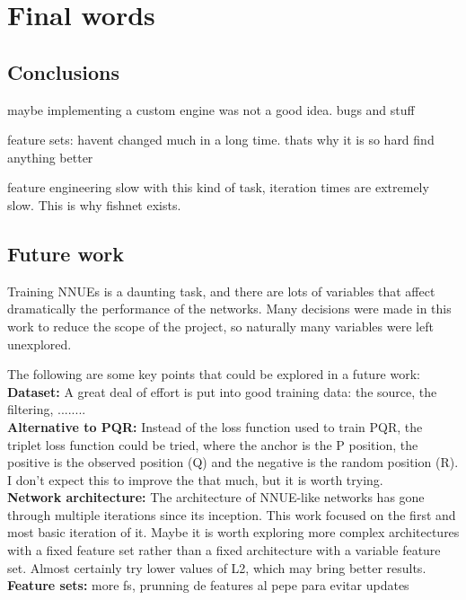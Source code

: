 \section{Final words}
\subsection{Conclusions}

maybe implementing a custom engine was not a good idea. bugs and stuff

feature sets: havent changed much in a long time. thats why it is so hard find anything better

feature engineering slow with this kind of task, iteration times are extremely slow. This is why fishnet exists.




\subsection{Future work}

Training NNUEs is a daunting task, and there are lots of variables that affect dramatically the performance of the networks. Many decisions were made in this work to reduce the scope of the project, so naturally many variables were left unexplored.

The following are some key points that could be explored in a future work: \\

\textbf{Dataset:}
A great deal of effort is put into good training data: the source, the filtering, ........ 
\\

\textbf{Alternative to PQR:} Instead of the loss function used to train PQR, the triplet loss function could be tried, where the anchor is the P position, the positive is the observed position (Q) and the negative is the random position (R). I don't expect this to improve the that much, but it is worth trying. \\

\textbf{Network architecture:} The architecture of NNUE-like networks has gone through multiple iterations since its inception. This work focused on the first and most basic iteration of it. Maybe it is worth exploring more complex architectures with a fixed feature set rather than a fixed architecture with a variable feature set.
Almost certainly try lower values of L2, which may bring better results. \\

\textbf{Feature sets:} more fs, prunning de features al pepe para evitar updates
